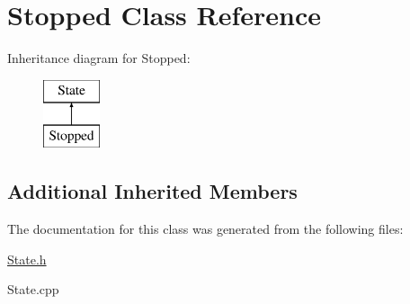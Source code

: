 \hypertarget{class_stopped}{}\section{Stopped Class Reference}
\label{class_stopped}
Inheritance diagram for Stopped\+:\begin{figure}[H]
\begin{center}
\leavevmode
\includegraphics[height=2.000000cm]{class_stopped}
\end{center}
\end{figure}
\subsection*{Additional Inherited Members}


The documentation for this class was generated from the following files\+:\begin{DoxyCompactItemize}
\item 
\mbox{\hyperlink{_state_8h}{State.\+h}}\item 
State.\+cpp\end{DoxyCompactItemize}

